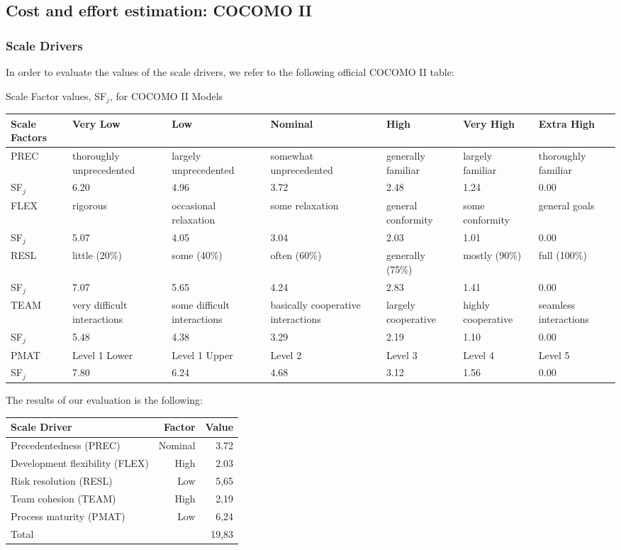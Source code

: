 \documentclass[english]{article}
\newcommand{\fptotal}[1]{
	\multicolumn{2}{|l|}{{Total}}
	& #1\\\hline
}
\newenvironment{scaledriverstable}[1]{
	\setlength{\LTleft}{-40pt}
	\begin{center}
	#1 
	\begin{longtable}{|p{\dimexpr.16\textwidth}|p{\dimexpr.14\textwidth}|p{\dimexpr.14\textwidth}|p{\dimexpr.14\textwidth}|p{\dimexpr.14\textwidth}|p{\dimexpr.14\textwidth}|p{\dimexpr.14\textwidth}|}
	\hline
}{
	\hline\end{longtable}\end{center}
}
\newenvironment{factorcounttable}[1]{
	\begin{center}
	\begin{longtable}{|l|r|r|}
	\hline 
	#1 & Factor & Value \\\hline
}{
	\end{longtable}\end{center}
}
\newcommand{\addfactor}[7]{
	#1 & #2 & #3 & #4 & #5 & #6 & #7 \\
}
\newcommand{\addfactorvalues}[6]{
SF$_j$ & #1 & #2 & #3 & #4 & #5 & #6 \\\hline
}
\begin{document}
\subsection{Cost and effort estimation: COCOMO II}
\subsubsection{Scale Drivers}
In order to evaluate the values of the scale drivers, we refer to the following official COCOMO II table:

\begin{scaledriverstable}{Scale Factor values, SF$_j$, for COCOMO II Models}
	Scale Factors & Very Low & Low & Nominal & High & Very High & Extra High\\\hline
	\addfactor{PREC}{thoroughly unprecedented}{largely unprecedented}{somewhat unprecedented}{generally familiar}{largely familiar}{thoroughly familiar}
	\addfactorvalues{6.20}{4.96}{3.72}{2.48}{1.24}{0.00}
	\addfactor{FLEX}{rigorous}{occasional relaxation}{some relaxation}{general conformity}{some conformity}{general goals}
	\addfactorvalues{5.07}{4.05}{3.04}{2.03}{1.01}{0.00}
	\addfactor{RESL}{little (20\%)}{some (40\%)}{often (60\%)}{generally (75\%)}{mostly (90\%)}{full (100\%)}
	\addfactorvalues{7.07}{5.65}{4.24}{2.83}{1.41}{0.00}
	\addfactor{TEAM}{very difficult interactions}{some difficult interactions}{basically cooperative interactions}{largely cooperative}{highly cooperative}{seamless interactions}
	\addfactorvalues{5.48}{4.38}{3.29}{2.19}{1.10}{0.00}
	\addfactor{PMAT}{Level 1 Lower}{Level 1 Upper}{Level 2}{Level 3}{Level 4}{Level 5}
	\addfactorvalues{7.80}{6.24}{4.68}{3.12}{1.56}{0.00}
\end{scaledriverstable}
The results of our evaluation is the following:
\begin{factorcounttable}{Scale Driver}
	Precedentedness (PREC) & Nominal & 3.72\\
	Development flexibility (FLEX) & High & 2.03\\
	Risk resolution (RESL) & Low & 5,65\\
	Team cohesion (TEAM) & High & 2,19\\
	Process maturity (PMAT) & Low & 6,24\\\hline
	\fptotal{19,83}
\end{factorcounttable}
\end{document}
